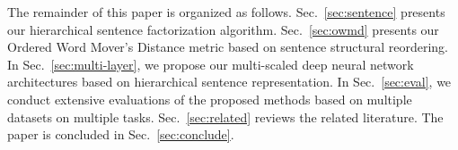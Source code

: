 The remainder of this paper is organized as follows.
Sec.~\ref{sec:sentence} presents our hierarchical sentence factorization algorithm.
Sec.~\ref{sec:owmd} presents our Ordered Word Mover's Distance metric based on sentence structural reordering.
In Sec.~\ref{sec:multi-layer}, we propose our multi-scaled deep neural network architectures based on hierarchical sentence representation.
In Sec.~\ref{sec:eval}, we conduct extensive evaluations of the proposed methods based on multiple datasets on multiple tasks.
Sec.~\ref{sec:related} reviews the related literature.
The paper is concluded in Sec.~\ref{sec:conclude}.


